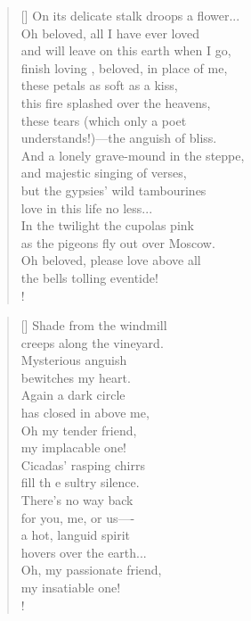 \documentclass[]{article}
\begin{document}
\vspace*{0.02\textheight}
\settowidth{\versewidth}{On its delicate stalk droops a flower }
\begin{verse}[\versewidth]
On its delicate stalk droops a flower...\\
Oh beloved, all I have ever loved\\
and will leave on this earth when I go,\\
finish loving , beloved, in place of me,\\
these petals as soft as a kiss,\\
this fire splashed over the heavens,\\
these tears (which only a poet\\
understands!)—the anguish of bliss.\\
And a lonely grave-mound in the steppe,\\
and majestic singing of verses,\\
but the gypsies' wild tambourines\\
love in this life no less...\\
In the twilight the cupolas pink\\
as the pigeons fly out over Moscow.\\
Oh beloved, please love above all\\
the bells tolling eventide!\\!
\end{verse}
\bigskip \bigskip

\settowidth{\versewidth}{Shade from the windmill }
\begin{verse}[\versewidth]
Shade from the windmill\\
creeps along the vineyard.\\
Mysterious anguish\\
bewitches my heart.\\
Again a dark circle\\
has closed in above me,\\
Oh my tender friend,\\
my implacable one!\\
Cicadas' rasping chirrs\\
fill th e sultry silence.\\
There's no way back\\
for you, me, or us—- \\
a hot, languid spirit\\
hovers over the earth...\\
Oh, my passionate friend,\\
my insatiable one!\\!
\end{verse}
\newpage
\end{document}
